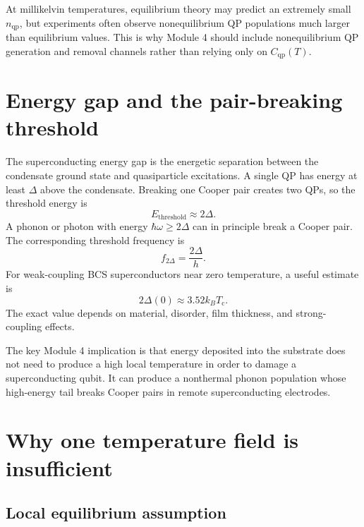 \documentclass[11pt]{article}
\newcommand{\Tc}{T_{\mathrm{c}}}
\newcommand{\Cqp}{C_{\mathrm{qp}}}
\newcommand{\nqp}{n_{\mathrm{qp}}}
\begin{document}
\begin{notebox}
At millikelvin temperatures, equilibrium theory may predict an extremely small \(\nqp\), but experiments often observe nonequilibrium QP populations much larger than equilibrium values. This is why Module 4 should include nonequilibrium QP generation and removal channels rather than relying only on \(\Cqp(T)\).
\end{notebox}

\section{Energy gap and the pair-breaking threshold}

The superconducting energy gap is the energetic separation between the condensate ground state and quasiparticle excitations. A single QP has energy at least \(\Delta\) above the condensate. Breaking one Cooper pair creates two QPs, so the threshold energy is
\begin{equation}
E_{\mathrm{threshold}} \approx 2\Delta.
\label{eq:pair_breaking_threshold}
\end{equation}
A phonon or photon with energy \(\hbar\omega\ge2\Delta\) can in principle break a Cooper pair. The corresponding threshold frequency is
\begin{equation}
f_{2\Delta}=\frac{2\Delta}{h}.
\end{equation}
For weak-coupling BCS superconductors near zero temperature, a useful estimate is
\begin{equation}
2\Delta(0) \approx 3.52 k_B\Tc.
\label{eq:bcs_gap}
\end{equation}
The exact value depends on material, disorder, film thickness, and strong-coupling effects.

The key Module 4 implication is that energy deposited into the substrate does not need to produce a high local temperature in order to damage a superconducting qubit. It can produce a nonthermal phonon population whose high-energy tail breaks Cooper pairs in remote superconducting electrodes.

\section{Why one temperature field is insufficient}

\subsection{Local equilibrium assumption}
\end{document}

